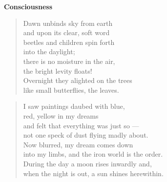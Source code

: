 \vspace*{-15mm}
\centeredornament
\vspace*{2mm}


\begin{center}
  \textbf{\large Consciousness}
\end{center}




\begin{verse}
  Dawn unbinds sky from earth \\
  and upon its clear, soft word \\
  beetles and children spin forth \\
  into the daylight; \\
  there is no moisture in the air, \\
  the bright levity floats! \\
  Overnight they alighted on the trees \\
  like small butterflies, the leaves.
\end{verse}

\bigskip




\begin{verse}
  I saw paintings daubed with blue, \\
  red, yellow in my dreams \\
  and felt that everything was just so ---\\
  not one speck of dust flying madly about. \\
  Now blurred, my dream comes down \\
  into my limbs, and the iron world is the order.\hspace*{-1mm} \\
  During the day a moon rises inwardly and, \\
  when the night is out, a sun shines herewithin.\hspace*{-1mm}
\end{verse}

